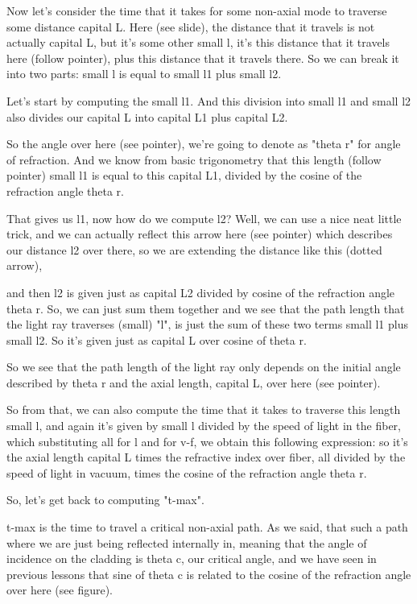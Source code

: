 Now let's consider the time that it takes for some non-axial mode to traverse some distance capital L. Here (see slide), the distance that it travels is not actually capital L, but it's some other small l, it's this distance that it travels here (follow pointer), plus this distance that it travels there. So we can break it into two parts: small l is equal to small l1 plus small l2.

Let's start by computing the small l1. And this division into small l1 and small l2 also divides our capital L into capital L1 plus capital L2.

So the angle over here (see pointer), we're going to denote as "theta r" for angle of refraction. And we know from basic trigonometry that this length (follow pointer) small l1 is equal to this capital L1, divided by the cosine of the refraction angle theta r.

That gives us l1, now how do we compute l2? Well, we can use a nice neat little trick, and we can actually reflect this arrow here (see pointer) which describes our distance l2 over there, so we are extending the distance like this (dotted arrow),

and then l2 is given just as capital L2 divided by cosine of the refraction angle theta r. So, we can just sum them together and we see that the path length that the light ray traverses (small) "l", is just the sum of these two terms small l1 plus small l2. So it's given just as capital L over cosine of theta r.

So we see that the path length of the light ray only depends on the initial angle described by theta r and the axial length, capital L, over here (see pointer).

So from that, we can also compute the time that it takes to traverse this length small l, and again it's given by small l divided by the speed of light in the fiber, which substituting all for l and for v-f, we obtain this following expression: so it's the axial length capital L times the refractive index over fiber, all divided by the speed of light in vacuum, times the cosine of the refraction angle theta r.

So, let's get back to computing "t-max".

t-max is the time to travel a critical non-axial path. As we said, that such a path where we are just being reflected internally in, meaning that the angle of incidence on the cladding is theta c, our critical angle, and we have seen in previous lessons that sine of theta c is related to the cosine of the refraction angle over here (see figure).

